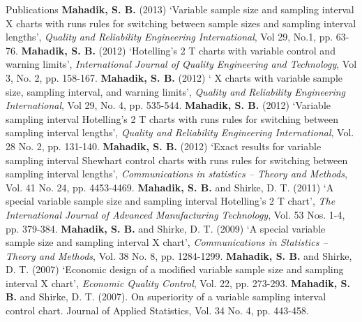 \begin{rubric}{\color{Maroon}Publications}
%
\entry*[] \textbf{\color{Maroon}Mahadik, S. B.} (2013) ‘Variable sample size and sampling interval X charts with runs rules for switching between sample sizes and
sampling interval lengths’, \textit{Quality and Reliability Engineering
	International}, Vol 29, No.1, pp. 63-76.
\vspace{0.12cm}
%
\entry*[] \textbf{\color{Maroon}Mahadik, S. B.} (2012) ‘Hotelling’s 2 T charts with variable control and warning limits’, \textit{International Journal of Quality Engineering and Technology}, Vol 3, No. 2, pp. 158-167.
\vspace{0.12cm}
%
\entry*[] \textbf{\color{Maroon}Mahadik, S. B.} (2012) ‘ X charts with variable sample size, sampling
interval, and warning limits’, \textit{Quality and Reliability Engineering
	International}, Vol 29, No. 4, pp. 535-544.
\vspace{0.12cm}
%
\entry*[] \textbf{\color{Maroon}Mahadik, S. B.} (2012) ‘Variable sampling interval Hotelling’s 2 T charts with runs rules for switching between sampling interval
lengths’, \textit{Quality and Reliability Engineering International}, Vol. 28 No. 2, pp. 131-140.
\vspace{0.12cm}
%
\entry*[] \textbf{\color{Maroon}Mahadik, S. B.} (2012) ‘Exact results for variable sampling interval Shewhart control charts with runs rules for switching between
sampling interval lengths’, \textit{Communications in statistics – Theory and
	Methods}, Vol. 41 No. 24, pp. 4453-4469.
\vspace{0.12cm}
%
\entry*[] \textbf{\color{Maroon}Mahadik, S. B.} and Shirke, D. T. (2011) ‘A special variable sample size and sampling interval Hotelling’s 2 T chart’, \textit{The International Journal of Advanced Manufacturing Technology}, Vol. 53 Nos. 1-4, pp. 379-384.
\vspace{0.12cm}
%
\entry*[] \textbf{\color{Maroon}Mahadik, S. B.} and Shirke, D. T. (2009) ‘A special variable sample size and sampling interval X chart’, \textit{Communications in Statistics – Theory and Methods}, Vol. 38 No. 8, pp. 1284-1299.
\vspace{0.12cm}
%
\entry*[] \textbf{\color{Maroon}Mahadik, S. B.} and Shirke, D. T. (2007) ‘Economic design of a modified variable sample size and sampling interval X chart’,
\textit{Economic Quality Control}, Vol. 22, pp. 273-293.
\vspace{0.12cm}
%
\entry*[] \textbf{\color{Maroon}Mahadik, S. B.} and Shirke, D. T. (2007). On superiority of a variable sampling interval control chart. Journal of Applied Statistics, Vol. 34 No. 4, pp. 443-458.
\end{rubric}